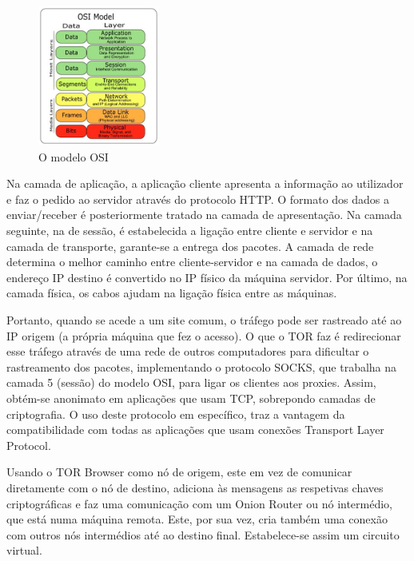 \documentclass{llncs}
\begin{document}
\begin{figure}
\begin{center}
\includegraphics[width=4cm]{osi.jpg}
\caption{\label{fig:2}O modelo OSI}
\end{center}
\end{figure}

\par Na camada de aplicação, a aplicação cliente apresenta a informação ao utilizador e faz o pedido ao servidor através do protocolo HTTP. O formato dos dados a enviar/receber é posteriormente tratado na camada de apresentação. Na camada seguinte, na de sessão, é estabelecida a ligação entre cliente e servidor e na camada de transporte, garante-se a entrega dos pacotes. A camada de rede determina o melhor caminho entre cliente-servidor e na camada de dados, o endereço IP destino é convertido no IP físico da máquina servidor. Por último, na camada física, os cabos ajudam na ligação física entre as máquinas.

\par Portanto, quando se acede a um site comum, o tráfego pode ser rastreado até ao IP origem (a própria máquina que fez o acesso). O que o TOR faz é redirecionar esse tráfego através de uma rede de outros computadores para dificultar o rastreamento dos pacotes, implementando o protocolo SOCKS, que trabalha na camada 5 (sessão) do modelo OSI, para ligar os clientes aos proxies. Assim, obtém-se anonimato em aplicações que usam TCP, sobrepondo camadas de criptografia.
O uso deste protocolo em específico, traz a vantagem da compatibilidade com todas as aplicações que usam conexões Transport Layer Protocol. \cite{Kumm}

\par Usando o TOR Browser como nó de origem, este em vez de comunicar diretamente com o nó de destino, adiciona às mensagens as respetivas chaves criptográficas e faz uma comunicação com um Onion Router ou nó intermédio, que está numa máquina remota. Este, por sua vez, cria também uma conexão com outros nós intermédios até ao destino final. Estabelece-se assim um circuito virtual. \cite{FM}
\end{document}
